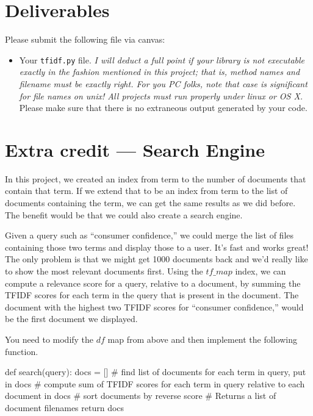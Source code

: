 \begin{fullwidth}
\section{Deliverables}

\noindent Please submit the following file via canvas:

\begin{itemize}
\item Your {\tt tfidf.py} file. {\em I will deduct a full point if your library is not executable exactly in the fashion mentioned in this project; that is, method names and filename must be exactly right. For you PC folks, note that case is significant for file names on unix! All projects must run properly under linux or OS X.} Please make sure that there is no extraneous output generated by your code.
\end{itemize}

\section{Extra credit --- Search Engine}

In this project, we created an index from term to the number of documents that contain that term. If we extend that to be an index from term to the list of documents containing the term, we can get the same results as we did before. The benefit would be that we could also create a search engine.

Given a query such as ``consumer confidence,'' we could merge the list of files containing those two terms and display those to a user. It's fast and works great! The only problem is that we might get 1000 documents back and we'd really like to show the most relevant documents first.  Using the $tf\_map$ index, we can compute a relevance score for a query, relative to a document, by summing the TFIDF scores for each term in the query that is present in the document. The document with the highest two TFIDF scores for ``consumer confidence,'' would be the first document we displayed.

You need to modify the $df$ map from above and then implement the following function.

\begin{pyverbatim}
def search(query):
    docs = []
    # find list of documents for each term in query, put in docs
    # compute sum of TFIDF scores for each term in query relative to each document in docs
    # sort documents by reverse score
    # Returns a list of document filenames
    return docs
\end{pyverbatim}

\end{fullwidth}

